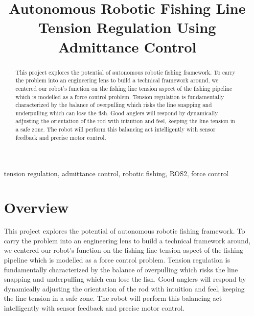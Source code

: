 \documentclass[conference]{IEEEtran}
\begin{document}
\title{Autonomous Robotic Fishing Line Tension Regulation Using Admittance Control}

\author{
\and
{}
\and
{}
\and
{}
}

\maketitle

\begin{abstract}
This project explores the potential of autonomous robotic fishing framework. To carry the problem into an engineering lens to build a technical framework around, we centered our robot’s function on the fishing line tension aspect of the fishing pipeline which is modelled as a force control problem. Tension regulation is fundamentally characterized by the balance of overpulling which risks the line snapping and underpulling which can lose the fish. Good anglers will respond by dynamically adjusting the orientation of the rod with intuition and feel, keeping the line tension in a safe zone. The robot will perform this balancing act intelligently with sensor feedback and precise motor control.
\end{abstract}

\begin{IEEEkeywords}
tension regulation, admittance control, robotic fishing, ROS2, force control
\end{IEEEkeywords}

\section{Overview}
This project explores the potential of autonomous robotic fishing framework. To carry the problem into an engineering lens to build a technical framework around, we centered our robot’s function on the fishing line tension aspect of the fishing pipeline which is modelled as a force control problem. Tension regulation is fundamentally characterized by the balance of overpulling which risks the line snapping and underpulling which can lose the fish. Good anglers will respond by dynamically adjusting the orientation of the rod with intuition and feel, keeping the line tension in a safe zone. The robot will perform this balancing act intelligently with sensor feedback and precise motor control.
\end{document}
